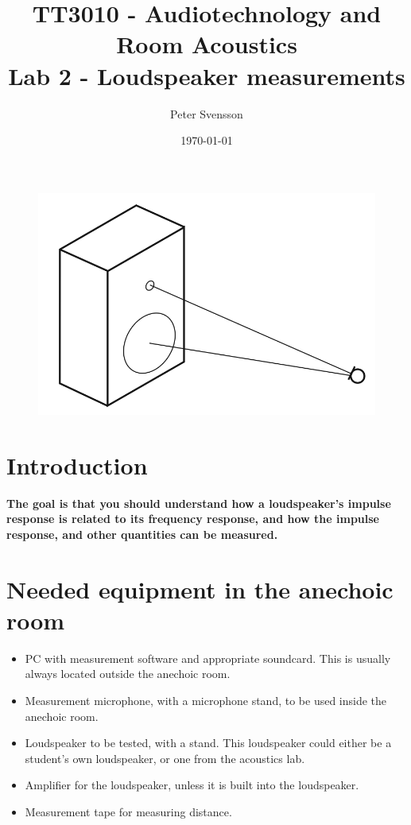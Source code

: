 \documentclass{article}
\title{TT3010 - Audiotechnology and Room Acoustics \\ Lab 2 - Loudspeaker measurements}
\author{Peter Svensson}
\date{\today}
\begin{document}
\maketitle

\begin{figure}[H]
\centering
\includegraphics[scale=1]{figs/Twowaylsp.png}
\end{figure}

\section{Introduction}
\textbf{The goal is that you should understand how a loudspeaker's impulse response is related to its frequency response, and how the impulse response,
and other quantities can be measured.}

\section{Needed equipment in the anechoic room}

\begin{itemize}
    \item PC with measurement software and appropriate soundcard. This is usually always located outside the anechoic room.
     \item Measurement microphone, with a microphone stand, to be used inside the anechoic room.
     \item Loudspeaker to be tested, with a stand. This loudspeaker could either be a student's own loudspeaker, or one from the acoustics lab.
     \item Amplifier for the loudspeaker, unless it is built into the loudspeaker. 
     \item Measurement tape for measuring distance.
\end{itemize}
\end{document}
